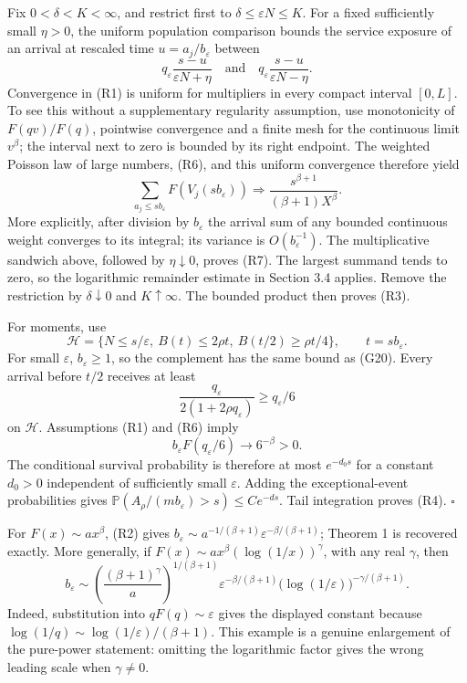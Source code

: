 \documentclass[
  11pt,
  a4paper,
]{scrartcl}
\begin{document}
Fix \(0<\delta<K<\infty\), and restrict first to
\(\delta\leq\varepsilon N\leq K\). For a fixed sufficiently small
\(\eta>0\), the uniform population comparison bounds the service
exposure of an arrival at rescaled time \(u=a_j/b_\varepsilon\) between
\[
q_\varepsilon\frac{s-u}{\varepsilon N+\eta}
\quad\text{and}\quad
q_\varepsilon\frac{s-u}{\varepsilon N-\eta}.
\] Convergence in (R1) is uniform for multipliers in every compact
interval \([0,L]\). To see this without a supplementary regularity
assumption, use monotonicity of \(F(qv)/F(q)\), pointwise convergence
and a finite mesh for the continuous limit \(v^\beta\); the interval
next to zero is bounded by its right endpoint. The weighted Poisson law
of large numbers, (R6), and this uniform convergence therefore yield \[
\sum_{a_j\leq s b_\varepsilon}F(V_j(s b_\varepsilon))
\Rightarrow\frac{s^{\beta+1}}{(\beta+1)X^\beta}. \tag{R7}
\] More explicitly, after division by \(b_\varepsilon\) the arrival sum
of any bounded continuous weight converges to its integral; its variance
is \(O(b_\varepsilon^{-1})\). The multiplicative sandwich above,
followed by \(\eta\downarrow0\), proves (R7). The largest summand tends
to zero, so the logarithmic remainder estimate in Section 3.4 applies.
Remove the restriction by \(\delta\downarrow0\) and \(K\uparrow\infty\).
The bounded product then proves (R3).

For moments, use \[
\mathcal H=\{N\leq s/\varepsilon,\ B(t)\leq2\rho t,\
B(t/2)\geq\rho t/4\},\qquad t=s b_\varepsilon .
\] For small \(\varepsilon\), \(b_\varepsilon\geq1\), so the complement
has the same bound as (G20). Every arrival before \(t/2\) receives at
least \[
\frac{q_\varepsilon}{2(1+2\rho q_\varepsilon)}
\geq q_\varepsilon/6
\] on \(\mathcal H\). Assumptions (R1) and (R6) imply \[
b_\varepsilon F(q_\varepsilon/6)\longrightarrow6^{-\beta}>0.
\] The conditional survival probability is therefore at most
\(e^{-d_0s}\) for a constant \(d_0>0\) independent of sufficiently small
\(\varepsilon\). Adding the exceptional-event probabilities gives
\(\mathbb P(A_\rho/(m b_\varepsilon)>s)\leq C e^{-ds}\). Tail
integration proves (R4). \(\square\)

For \(F(x)\sim ax^\beta\), (R2) gives
\(b_\varepsilon\sim a^{-1/(\beta+1)}\varepsilon^{-\beta/(\beta+1)}\);
Theorem 1 is recovered exactly. More generally, if
\(F(x)\sim ax^\beta(\log(1/x))^\gamma\), with any real \(\gamma\), then
\[
b_\varepsilon\sim
\left(\frac{(\beta+1)^\gamma}{a}\right)^{1/(\beta+1)}
\varepsilon^{-\beta/(\beta+1)}
\bigl(\log(1/\varepsilon)\bigr)^{-\gamma/(\beta+1)}. \tag{R8}
\] Indeed, substitution into \(qF(q)\sim\varepsilon\) gives the
displayed constant because
\(\log(1/q)\sim\log(1/\varepsilon)/(\beta+1)\). This example is a
genuine enlargement of the pure-power statement: omitting the
logarithmic factor gives the wrong leading scale when \(\gamma\ne0\).
\end{document}
